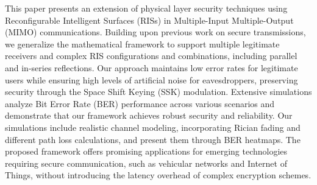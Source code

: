 This paper presents an extension of physical layer security techniques using Reconfigurable Intelligent Surfaces (RISs) in Multiple-Input Multiple-Output (MIMO) communications. Building upon previous work on secure transmissions, we generalize the mathematical framework to support multiple legitimate receivers and complex RIS configurations and combinations, including parallel and in-series reflections. Our approach maintains low error rates for legitimate users while ensuring high levels of artificial noise for eavesdroppers, preserving security through the Space Shift Keying (SSK) modulation. Extensive simulations analyze Bit Error Rate (BER) performance across various scenarios and demonstrate that our framework achieves robust security and reliability. Our simulations include realistic channel modeling, incorporating Rician fading and different path loss calculations, and present them through BER heatmaps. The proposed framework offers promising applications for emerging technologies requiring secure communication, such as vehicular networks and Internet of Things, without introducing the latency overhead of complex encryption schemes.
